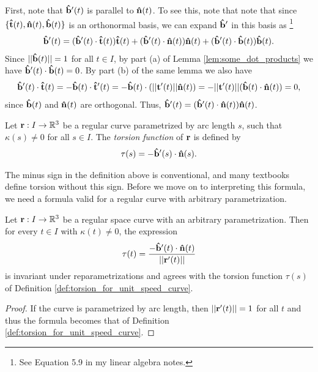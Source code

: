 \documentclass[12pt,letterpaper,reqno]{article}
\numberwithin{equation}{section}
\newcommand{\bbr}{{\bf r}}
\newcommand{\bt}{{\bf t}}
\newcommand{\ut}{{\bf {\hat{t}}}}
\newcommand{\un}{{\bf {\hat{n}}}}
\newcommand{\ub}{{\bf {\hat{b}}}}
\begin{document}
{First, note that $\ub'(t)$ is parallel to $\un(t)$. To see this, note that note that since $\{\ut(t),\un(t),\ub(t)\}$ is an orthonormal basis, we can expand $\ub'$ in this basis as \footnote{See Equation 5.9 in my linear algebra notes.}
\begin{align*}
	\ub'(t)=(\ub'(t)\cdot \ut(t))\ut(t)+(\ub'(t)\cdot \un(t))\un(t)+(\ub'(t)\cdot \ub(t))\ub(t).
\end{align*}
Since $||\ub(t)||=1$ for all $t \in I$, by part (a) of Lemma \ref{lem:some_dot_products} we have $\ub'(t) \cdot \ub(t)=0$. By part (b) of the same lemma we also have
\begin{align*}
	\ub'(t) \cdot \ut(t)=-\ub(t)\cdot \ut'(t)=-\ub(t)\cdot (||\bt'(t)||\un(t))=-||\bt'(t)||(\ub(t) \cdot \un(t))=0,
\end{align*}
since $\ub(t)$ and $\un(t)$ are orthogonal. Thus, $\ub'(t)=(\ub'(t)\cdot \un(t))\un(t)$.

\begin{defn}\label{def:torsion_for_unit_speed_curve}
	Let $\bbr:I \to \mathbb{R}^3$ be a regular curve parametrized by arc length $s$, such that $\kappa(s) \neq 0$ for all $s \in I$. The \emph{torsion function} of $\bbr$ is defined by
	\begin{align*}
		\tau(s)=-\ub'(s) \cdot \un(s).
	\end{align*} 
\end{defn}
The minus sign in the definition above is conventional, and many textbooks define torsion without this sign. Before we move on to interpreting this formula, we need a formula valid for a regular curve with arbitrary parametrization.

\begin{prop}
	Let $\bbr:I \to \mathbb{R}^3$ be a regular space curve with an arbitrary parametrization. Then for every $t \in I$ with $\kappa(t) \neq 0$, the expression
	\begin{align}\label{eq:tau_proposed}
		\tau(t)=\frac{-\ub'(t) \cdot \un(t)}{||\bbr'(t)||}
	\end{align}
	is invariant under reparametrizations and agrees with the torsion function $\tau(s)$ of Definition \ref{def:torsion_for_unit_speed_curve}.
\end{prop}

\begin{proof}
	If the curve is parametrized by arc length, then $||\bbr'(t)||=1$ for all $t$ and thus the formula becomes that of Definition \ref{def:torsion_for_unit_speed_curve}.
	

\end{proof}}
\end{document}

